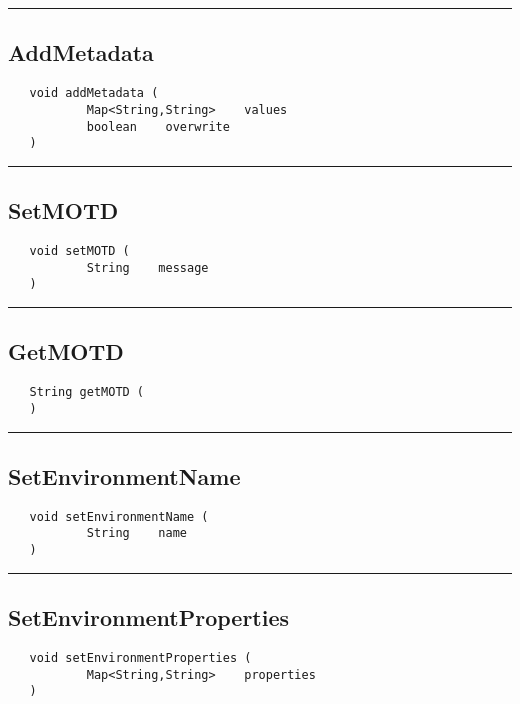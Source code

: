 \rule{15cm}{2pt}
\subsection{AddMetadata}
\label{Api:AddMetadata}
\begin{verbatim}
   void addMetadata (
           Map<String,String>    values
           boolean    overwrite
   )
\end{verbatim}



\rule{15cm}{2pt}
\subsection{SetMOTD}
\label{Api:SetMOTD}
\begin{verbatim}
   void setMOTD (
           String    message
   )
\end{verbatim}



\rule{15cm}{2pt}
\subsection{GetMOTD}
\label{Api:GetMOTD}
\begin{verbatim}
   String getMOTD (
   )
\end{verbatim}



\rule{15cm}{2pt}
\subsection{SetEnvironmentName}
\label{Api:SetEnvironmentName}
\begin{verbatim}
   void setEnvironmentName (
           String    name
   )
\end{verbatim}



\rule{15cm}{2pt}
\subsection{SetEnvironmentProperties}
\label{Api:SetEnvironmentProperties}
\begin{verbatim}
   void setEnvironmentProperties (
           Map<String,String>    properties
   )
\end{verbatim}



